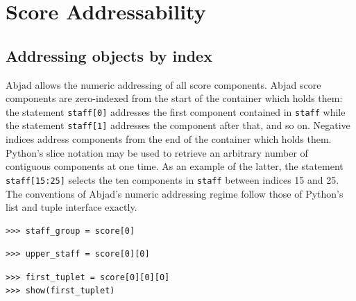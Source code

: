 \section{Score Addressability}\label{sec:score_addressability}

\subsection{Addressing objects by index}

Abjad allows the numeric addressing of all score components. Abjad score
components are zero-indexed from the start of the container which holds them:
the statement \texttt{staff[0]} addresses the first component contained in
\texttt{staff} while the statement \texttt{staff[1]} addresses the component
after that, and so on. Negative indices address components from the end of the
container which holds them. Python's slice notation may be used to retrieve an
arbitrary number of contiguous components at one time. As an example of the
latter, the statement \texttt{staff[15:25]} selects the ten components in
\texttt{staff} between indices 15 and 25. The conventions of Abjad's numeric
addressing regime follow those of Python's list and tuple interface exactly. 

\begin{lstlisting}
>>> staff_group = score[0]
\end{lstlisting}


\begin{lstlisting}
>>> upper_staff = score[0][0]
\end{lstlisting}


\begin{lstlisting}
>>> first_tuplet = score[0][0][0]
>>> show(first_tuplet)
\end{lstlisting}

